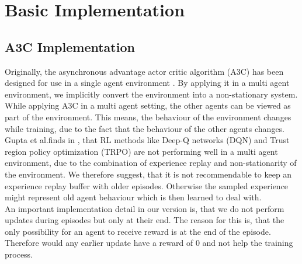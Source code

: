 
%
%

\chapter{Basic Implementation}\label{chap.basic_implementation}
\section{A3C Implementation}\label{a3c_implementation}
Originally, the asynchronous advantage actor critic algorithm (A3C) has been designed for use in a single agent environment \cite{a3c}.
By applying it in a multi agent environment, we implicitly convert the environment into a non-stationary system.
While applying A3C in a multi agent setting, the other agents can be viewed as part of the environment. This means, the behaviour of the environment changes while training, due to the fact that the behaviour of the other agents changes.
Gupta et al.finds in \cite{multiagent_comp_a3c_dqn_etc}, that RL methods like Deep-Q networks (DQN) and Trust region policy optimization (TRPO) are not performing well in a multi agent environment, due to the combination of experience replay and non-stationarity of the environment. We therefore suggest, that it is not recommendable to keep an experience replay buffer with older episodes. Otherwise the sampled experience might represent old agent behaviour which is then learned to deal with.\\
An important implementation detail in our version is, that we do not perform updates during episodes but only at their end. The reason for this is, that the only possibility for an agent to receive reward is at the end of the episode. Therefore would any earlier update have a reward of 0 and not help the training process.

